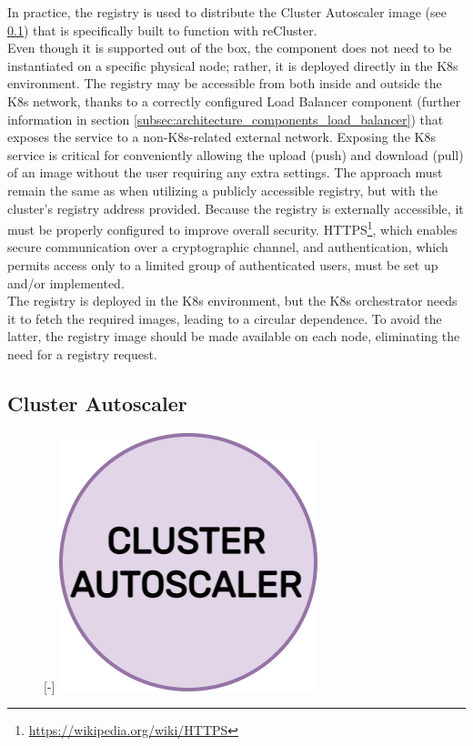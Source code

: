 In practice, the registry is used to distribute the Cluster Autoscaler image (see
\ref{subsec:architecture_components_cluster_autoscaler}) that is specifically built
to function with reCluster. \\ %
Even though it is supported out of the box, the component does not need to be
instantiated on a specific physical node; rather, it is deployed directly in the
K8s environment. The registry may be accessible from both inside and outside the
K8s network, thanks to a correctly configured Load Balancer component (further information
in section \ref{subsec:architecture_components_load_balancer}) that exposes the
service to a non-K8s-related external network. Exposing the K8s service is critical
for conveniently allowing the upload (push) and download (pull) of an image without
the user requiring any extra settings. The approach must remain the same as when
utilizing a publicly accessible registry, but with the cluster's registry address
provided. Because the registry is externally accessible, it must be properly configured
to improve overall security. HTTPS\footnote{\url{https://wikipedia.org/wiki/HTTPS}},
which enables secure communication over a cryptographic channel, and
authentication, which permits access only to a limited group of authenticated users,
must be set up and/or implemented. \\ %
The registry is deployed in the K8s environment, but the K8s orchestrator needs it
to fetch the required images, leading to a circular dependence. To avoid the latter,
the registry image should be made available on each node, eliminating the need for
a registry request.

\subsection{Cluster Autoscaler}
\label{subsec:architecture_components_cluster_autoscaler}

\begin{figure} %
  \raisebox{0pt}[\dimexpr\height-\baselineskip\relax]{\centering
  \includegraphics[width=.2\textwidth]{images/recluster/cluster_autoscaler.png}}
\end{figure}

